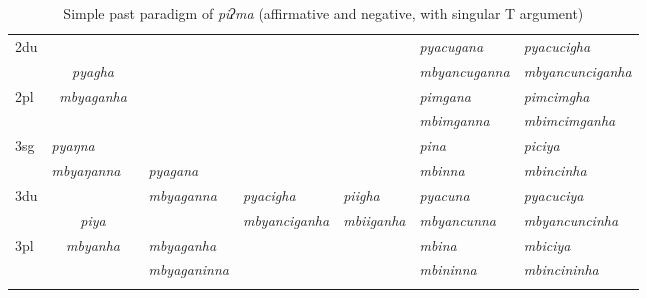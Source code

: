 \begin{sidewaystable}[p]
{\begin{tabular}{l|p{2.4cm}|p{1.5cm}|p{2.4cm}|p{2.4cm}|p{2.4cm}|p{3.2cm}|p{3.2cm}}
 \cline{1-2} \cline{7-8}			
{\sc 2du}		& 	\multicolumn{2}{c|}{}     &  \multicolumn{3}{c|}{\cellcolor[gray]{.8}} & \it  pyacugana  & \it   pyacucigha \\
		&  	\multicolumn{2}{c|}{\it  pyagha} &   \multicolumn{3}{c|}{\cellcolor[gray]{.8}}& \it mbyancuganna  & \it  mbyancunciganha \\
 \cline{1-1} \cline{7-8}			
{\sc 2pl}	& 	\multicolumn{2}{c|}{\it mbyaganha} &   \multicolumn{3}{c|}{ \cellcolor[gray]{.8}}& \it  pimgana& \it  pimcimgha  \\
		&  	\multicolumn{2}{c|}{ }&   \multicolumn{3}{c|}{\cellcolor[gray]{.8} }& \it  mbimganna & \it  mbimcimganha \\
\hline
{\sc 3sg}	& \it pyaŋna	  & \it 	      	& \it   			& \it     & \it     	& \it pina& \it piciya\\
		& \it  mbyaŋanna   & \it    	& \it  pyagana& \it   & \it    & \it mbinna& \it mbincinha\\
  \cline{1-2}  \cline{7-8}					
{\sc 3du}		&   \multicolumn{2}{c|}{}& \it mbyaganna& \it pyacigha & \it    piigha& \it   pyacuna & \it   pyacuciya\\
		&   \multicolumn{2}{c|}{\it piya}& \it   		& \it 		mbyanciganha	& \it  mbiiganha & \it  mbyancunna & \it  mbyancuncinha\\
 \cline{1-1} \cline{4-4} \cline{7-8}	
{\sc 3pl}		&\multicolumn{2}{c|}{\it mbyanha}& \it mbyaganha& \it & \it  & \it mbina& \it mbiciya\\	
	& \multicolumn{2}{c|}{ }& \it mbyaganinna& \it  & \it  & \it mbininna& \it mbincininha \\
\lspbottomrule
\end{tabular}
}
\caption{Simple past paradigm of \emph{piʔma}  (affirmative and negative, with singular T argument)}\label{par-pipma-pst}
\end{sidewaystable}




